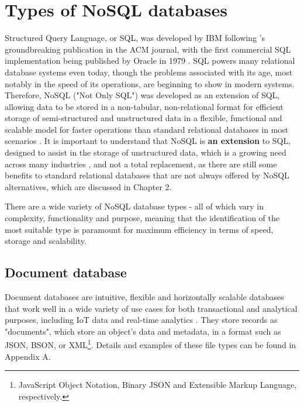 \chapter{Types of NoSQL databases}
\noindent Structured Query Language, or SQL, was developed by IBM following \textcite{coddRelationalModelData1970}'s groundbreaking 
publication in the ACM journal, with the first commercial SQL implementation being published by Oracle in 1979 \autocite{oracleHistorySQL}.
SQL powers many relational database systems even today, though the problems associated with its age, most notably in 
the speed of its operations, are beginning to show in modern systems. Therefore, NoSQL ("Not Only SQL") was developed as 
an extension of SQL, allowing data to be stored in a non-tabular, non-relational format for efficient storage of
semi-structured and unstructured data in a flexible, functional and scalable model for faster operations than standard 
relational databases in most scenarios \autocite{googlecloudWhatNoSQLDatabases, awsWhatNoSQLDatabase}. It is important to understand 
that NoSQL is \textbf{an extension} to SQL, designed to assist in the storage of unstructured data, which is a growing need across 
many industries \autocite{corbelliniPersistingBigdataNoSQL2017}, and not a total replacement, as there are still some benefits to 
standard relational databases that are not always offered by NoSQL alternatives, which are discussed in Chapter 2. 

\para There are a wide variety of NoSQL database types - all of which vary in complexity, functionality and purpose, meaning that the
identification of the most suitable type is paramount for maximum efficiency in terms of speed, storage and scalability. 


\section{Document database}\label{sec:DocDBs}
Document databases are intuitive, flexible and horizontally scalable databases that work well in a wide variety of use cases
for both transactional and analytical purposes, including IoT data and real-time analytics \autocite{mongodbDocumentDatabaseNoSQL}.
They store records as "documents", which store an object's data and metadata, in a format such as JSON, BSON, or XML\footnote{JavaScript Object Notation, Binary JSON and Extensible Markup Language, respectively.}. Details and examples of these file types can be found in Appendix A.

